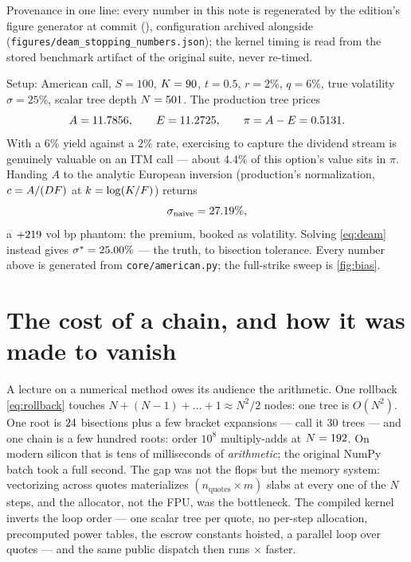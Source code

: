 \documentclass[11pt]{article}
\begin{document}
Provenance in one line: every number in this note is regenerated by the
edition's figure generator at commit \texttt{\deamstgencommit}
(\deamstgendate), configuration archived alongside
(\nolinkurl{figures/deam_stopping_numbers.json}); the kernel timing is
read from the stored benchmark artifact of the original suite, never
re-timed.

\begin{example}[title={Case file: one strike of \cref{fig:bias}}]
Setup: American call, $S=100$, $K=90$, $t=0.5$, $r=2\%$,
$q=6\%$, true volatility $\sigma=25\%$, scalar tree depth
$N=501$.  The production tree prices
\[
A=11.7856,\qquad
E=11.2725,\qquad
\pi=A-E=0.5131 .
\]
With a $6\%$ yield against a $2\%$ rate, exercising to capture the
dividend stream is genuinely valuable on an ITM call --- about $4.4\%$ of
this option's value sits in $\pi$.  Handing $A$ to the analytic European
inversion (production's normalization, $c=A/(DF)$ at
$k=\log(K/F)$) returns
\[
\sigma_{\text{naive}}=27.19\%,
\]
a $+219$ vol bp phantom: the premium, booked as volatility.
Solving \cref{eq:deam} instead gives $\sigma^*=25.00\%$ --- the
truth, to bisection tolerance.  Every number above is generated from
\texttt{core/american.py}; the full-strike sweep is \cref{fig:bias}.
\end{example}

\section{The cost of a chain, and how it was made to vanish}
\label{sec:cost}

A lecture on a numerical method owes its audience the arithmetic.  One
rollback \eqref{eq:rollback} touches $N+(N-1)+\dots+1\approx N^2/2$ nodes:
one tree is $O(N^2)$.  One root is $24$ bisections plus a few
bracket expansions --- call it $30$ trees --- and one chain is a few
hundred roots: order $10^8$ multiply-adds at $N=192$.  On modern
silicon that is tens of milliseconds of \emph{arithmetic}; the original
NumPy batch took a full second.  The gap was not the flops but the memory
system: vectorizing across quotes materializes $(n_{\text{quotes}}\times
m)$ slabs at every one of the $N$ steps, and the allocator, not the FPU,
was the bottleneck.  The compiled kernel inverts the loop order --- one
scalar tree per quote, no per-step allocation, precomputed power tables,
the escrow constants hoisted, a parallel loop over quotes --- and the same
public dispatch then runs \deamspeedup$\times$ faster.
\end{document}

